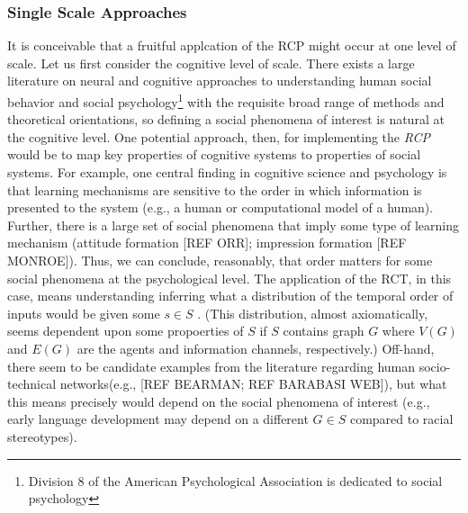 \documentclass{article}
\begin{document}
\subsubsection{Single Scale Approaches}
It is conceivable that a fruitful applcation of the RCP might occur at one level of scale.  Let us first consider the cognitive level of scale.  There exists a large literature on neural and cognitive approaches to understanding human social behavior and social psychology\footnote{Division 8 of the American Psychological Association is dedicated to social psychology} with the requisite broad range of methods and theoretical orientations, so defining a social phenomena of interest is natural at the cognitive level. One potential approach, then, for implementing the \textit{RCP} would be to map key properties of cognitive systems to properties of social systems.  For example, one central finding in cognitive science and psychology is that learning mechanisms are sensitive to the order in which information is presented to the system (e.g., a human or computational model of a human).  Further, there is a large set of social phenomena that imply some type of learning mechanism (attitude formation [REF ORR]; impression formation [REF MONROE]).  Thus, we can conclude, reasonably, that order matters for some social phenomena at the psychological level.  The application of the RCT, in this case, means understanding inferring what a distribution of the temporal order of inputs would be given some $s \in S$ . (This distribution, almost axiomatically, seems dependent upon some propoerties of $S$ if $S$ contains graph $G$ where $V(G)$ and $E(G)$ are the agents and information channels, respectively.)  Off-hand, there seem to be candidate examples from the literature regarding human socio-technical networks(e.g., [REF BEARMAN; REF BARABASI WEB]), but what this means precisely would depend on the social phenomena of interest (e.g., early language development may depend on a different $G \in S$ compared to racial stereotypes).
\end{document}
